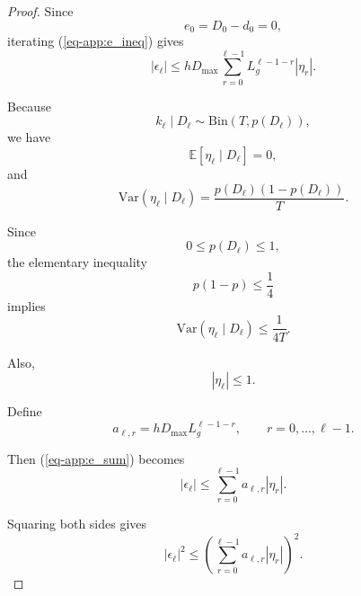 \documentclass[10pt]{iopart}
\newcommand{\1}{\mathbf{1}}
\begin{document}
\begin{proof}
Since
\begin{equation}
e_0=D_0-d_0=0,
\label{eq-app:e0}
\end{equation}
iterating (\ref{eq-app:e_ineq}) gives
\begin{equation}
|\epsilon_\ell|
\le
hD_{\max}
\sum_{r=0}^{\ell-1}
L_g^{\ell-1-r}
|\eta_r|.
\label{eq-app:e_sum}
\end{equation}

Because
\begin{equation}
k_\ell\mid D_\ell
\sim
\mathrm{Bin}(T,p(D_\ell)),
\label{eq-app:binomial_repeat}
\end{equation}
we have
\begin{equation}
\mathbb E[\eta_\ell\mid D_\ell]=0,
\label{eq-app:eta_mean}
\end{equation}
and
\begin{equation}
\mathrm{Var}(\eta_\ell\mid D_\ell)
=
\frac{p(D_\ell)(1-p(D_\ell))}{T}.
\label{eq-app:eta_var}
\end{equation}

Since
\begin{equation}
0\le p(D_\ell)\le 1,
\label{eq-app:p_bounds}
\end{equation}
the elementary inequality
\begin{equation}
p(1-p)\le \frac14
\label{eq-app:pineq}
\end{equation}
implies
\begin{equation}
\mathrm{Var}(\eta_\ell\mid D_\ell)
\le
\frac{1}{4T}.
\label{eq-app:eta_var_bound}
\end{equation}

Also,
\begin{equation}
|\eta_\ell|\le 1.
\label{eq-app:eta_abs}
\end{equation}

Define
\begin{equation}
a_{\ell,r}
=
hD_{\max}L_g^{\ell-1-r},
\qquad
r=0,\ldots,\ell-1.
\label{eq-app:a_def}
\end{equation}

Then (\ref{eq-app:e_sum}) becomes
\begin{equation}
|\epsilon_\ell|
\le
\sum_{r=0}^{\ell-1}
a_{\ell,r}|\eta_r|.
\label{eq-app:e_sum2}
\end{equation}

Squaring both sides gives
\begin{equation}
|\epsilon_\ell|^2
\le
\left(
\sum_{r=0}^{\ell-1}
a_{\ell,r}|\eta_r|
\right)^2.
\label{eq-app:square}
\end{equation}


\end{proof}
\end{document}
